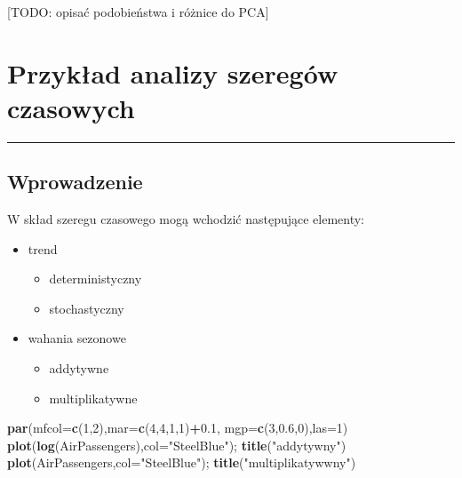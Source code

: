 \documentclass[polish,]{book}
\newenvironment{Shaded}{\begin{snugshade}}{\end{snugshade}}
\newcommand{\DataTypeTok}[1]{\textcolor[rgb]{0.13,0.29,0.53}{#1}}
\newcommand{\DecValTok}[1]{\textcolor[rgb]{0.00,0.00,0.81}{#1}}
\newcommand{\FloatTok}[1]{\textcolor[rgb]{0.00,0.00,0.81}{#1}}
\newcommand{\KeywordTok}[1]{\textcolor[rgb]{0.13,0.29,0.53}{\textbf{#1}}}
\newcommand{\NormalTok}[1]{#1}
\newcommand{\OperatorTok}[1]{\textcolor[rgb]{0.81,0.36,0.00}{\textbf{#1}}}
\newcommand{\StringTok}[1]{\textcolor[rgb]{0.31,0.60,0.02}{#1}}
\begin{document}
{[}TODO: opisać podobieństwa i różnice do PCA{]}

\hypertarget{part_7}{%
\chapter{Przykład analizy szeregów czasowych}\label{part_7}}

\begin{center}\rule{0.5\linewidth}{\linethickness}\end{center}

\hypertarget{part_71}{%
\section{Wprowadzenie}\label{part_71}}

W skład szeregu czasowego mogą wchodzić następujące elementy:

\begin{itemize}
\item
  trend

  \begin{itemize}
  \item
    deterministyczny
  \item
    stochastyczny
  \end{itemize}
\item
  wahania sezonowe

  \begin{itemize}
  \item
    addytywne
  \item
    multiplikatywne
  \end{itemize}
\end{itemize}

\begin{Shaded}
\begin{Highlighting}[]
\KeywordTok{par}\NormalTok{(}\DataTypeTok{mfcol=}\KeywordTok{c}\NormalTok{(}\DecValTok{1}\NormalTok{,}\DecValTok{2}\NormalTok{),}\DataTypeTok{mar=}\KeywordTok{c}\NormalTok{(}\DecValTok{4}\NormalTok{,}\DecValTok{4}\NormalTok{,}\DecValTok{1}\NormalTok{,}\DecValTok{1}\NormalTok{)}\OperatorTok{+}\FloatTok{0.1}\NormalTok{, }\DataTypeTok{mgp=}\KeywordTok{c}\NormalTok{(}\DecValTok{3}\NormalTok{,}\FloatTok{0.6}\NormalTok{,}\DecValTok{0}\NormalTok{),}\DataTypeTok{las=}\DecValTok{1}\NormalTok{)}
\KeywordTok{plot}\NormalTok{(}\KeywordTok{log}\NormalTok{(AirPassengers),}\DataTypeTok{col=}\StringTok{"SteelBlue"}\NormalTok{); }\KeywordTok{title}\NormalTok{(}\StringTok{"addytywny"}\NormalTok{)}
\KeywordTok{plot}\NormalTok{(AirPassengers,}\DataTypeTok{col=}\StringTok{"SteelBlue"}\NormalTok{); }\KeywordTok{title}\NormalTok{(}\StringTok{"multiplikatywwny"}\NormalTok{)}
\end{Highlighting}
\end{Shaded}
\end{document}
